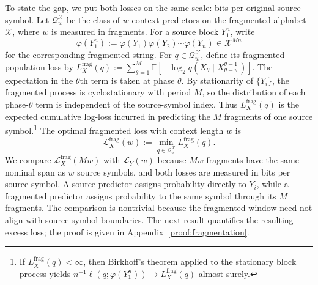 \documentclass{article}
\theoremstyle{plain}
\theoremstyle{definition}
\theoremstyle{remark}
\begin{document}
    
    To state the gap, we put both losses on the same scale: bits per original
    source symbol.  Let $\mathcal{Q}_{w}^{\mathcal{X}}$ be the class of
    $w$-context predictors on the fragmented alphabet $\mathcal{X}$, where
    $w$ is measured in fragments.  For a source block $Y_1^n$, write
    \[
        \varphi(Y_1^n)
        :=
        \varphi(Y_1)\varphi(Y_2)\cdots\varphi(Y_n)
        \in \mathcal{X}^{Mn}
    \]
    for the corresponding fragmented string. For $q\in\mathcal{Q}_{w}^{\mathcal{X}}$, define its fragmented population
    loss by
   $
        L_X^{\mathrm{frag}}(q)
        :=
        \sum_{\theta=1}^{M}
        \mathbb{E}\!\left[
            -\log_2
            q\!\left(
                X_{\theta}
                \mid
                X_{\theta-w}^{\theta-1}
            \right)
        \right].
        \label{eq:fragmented-population-loss}$
    The expectation in the $\theta$th term is taken at phase $\theta$.  By
    stationarity of $\{Y_i\}$, the fragmented process is cyclostationary with
    period $M$, so the distribution of each phase-$\theta$ term is independent
    of the source-symbol index.  Thus $L_X^{\mathrm{frag}}(q)$ is the expected
    cumulative log-loss incurred in predicting the $M$ fragments of one source
    symbol.\footnote{If
    $L_X^{\mathrm{frag}}(q)<\infty$, then Birkhoff's theorem applied to the
    stationary block process yields
    $
        n^{-1}\ell(q;\varphi(Y_1^n))
        \to
        L_X^{\mathrm{frag}}(q)
    $
    almost surely.} The optimal fragmented loss with context length $w$ is
    \begin{equation}
        \mathcal{L}_X^{\mathrm{frag}}(w)
        :=
        \min_{q\in\mathcal{Q}_{w}^{\mathcal{X}}}
        L_X^{\mathrm{frag}}(q).
        \label{eq:optimal-fragmented-loss}
    \end{equation}
    We compare $\mathcal{L}_X^{\mathrm{frag}}(Mw)$ with $\mathcal{L}_Y(w)$ because
$Mw$ fragments have the same nominal span as $w$ source symbols, and both losses
are measured in bits per source symbol. A source predictor assigns probability
directly to $Y_i$, while a fragmented predictor assigns probability to the same
symbol through its $M$ fragments. The comparison is nontrivial because the
fragmented window need not align with source-symbol boundaries. The next result
quantifies the resulting excess loss; the proof is given in
Appendix~\ref{proof:fragmentation}.
    
    
    
\end{document}
